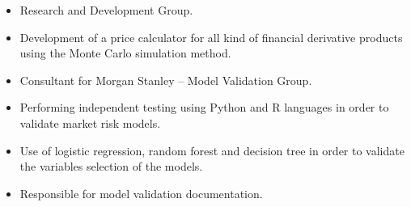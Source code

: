 \documentclass[10pt,a4paper,ragged2e]{altacv}
\begin{document}

\begin{fullwidth}
\makecvheader
\end{fullwidth}




\begin{itemize}
\item Research and Development Group.
\item Development of a price calculator for all kind of financial derivative products using the Monte Carlo simulation method.
\end{itemize}

\divider

\begin{itemize}
\item Consultant for Morgan Stanley – Model Validation Group.
\item Performing independent testing using Python and R languages in order to validate market risk models. 
\item Use of logistic regression, random forest and decision tree in order to validate the variables selection of the models.
\item Responsible for model validation documentation. 

\end{itemize}

\divider
\end{document}

